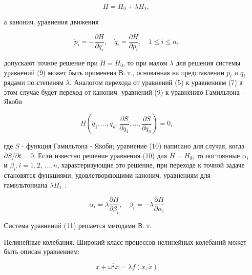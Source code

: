 \documentclass[10pt]{article}
\begin{document}
\[

H=H_{0}+\lambda H_{1} \text {, }

\]



а канонич. уравнения движения



\[

\dot{p}_{i}=-\frac{\partial H}{\partial q_{i}}, \quad \dot{q}_{i}=\frac{\partial H}{\partial p_{i}}, \quad 1 \leqslant i \leqslant n,

\]



допускают точное решение при $H=H_{0}$, то при малом $\lambda$ для решения системы уравнений (9) может быть применена В. т., основанная на представлении $p_{i}$ и $q_{i}$ рядами по степеням $\lambda$. Аналогом перехода от уравнений (5) к уравнениям (7) в этом случае будет переход от канонич. уравнений (9) к уравнению Гамильтона - Якоби



\[

H\left(q_{1}, \ldots, q_{n}, \frac{\partial S}{\partial q_{1}}, \ldots, \frac{\partial S}{\partial q_{n}}\right)=0,

\]



где $S$ - функция Гамильтона - Якоби; уравнение (10) написано для случая, когда $\partial S / \partial t=0$. Если известно решение уравнения (10) для $H=H_{0}$, то постоянные $\alpha_{i}$ и $\beta_{i}, i=1,2$, $\ldots, n$, характеризующие это решение, при переходе к точной задаче становятся функциями, удовлетворяющими канонич. уравнениям для гамильтониана $\lambda H_{1}$ :



\[

\dot{\alpha}_{i}=\lambda \frac{\partial H}{\partial \beta_{i}}, \quad \dot{\beta}_{i}=-\lambda \frac{\partial H}{\partial \alpha_{i}}

\]



Система уравнений (11) решается методами В. т.



Нелинейные колебания. Широкий класс процессов нелинейных колебаний может быть описан уравнением:



\[

\ddot{x}+\omega^{2} x=\lambda f(x, \dot{x})

\]
\end{document}
